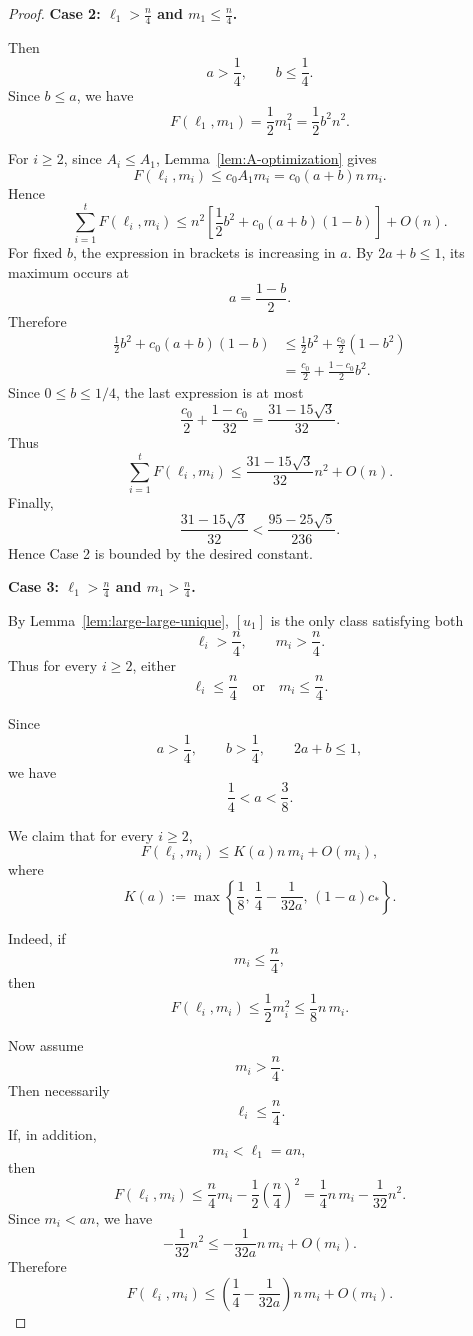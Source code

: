 \documentclass[10pt,a4paper]{amsart}
\begin{document}
\begin{proof}
\medskip

\noindent
\textbf{Case 2: \(\ell_1>\frac n4\) and \(m_1\le\frac n4\).}

Then
\[
        a>\frac14,
        \qquad
        b\le\frac14.
\]
Since \(b\le a\), we have
\[
        F(\ell_1,m_1)=\frac12m_1^2=\frac12b^2n^2.
\]

For \(i\ge2\), since \(A_i\le A_1\), Lemma~\ref{lem:A-optimization} gives
\[
        F(\ell_i,m_i)\le c_0A_1m_i
        =
        c_0(a+b)n\,m_i.
\]
Hence
\[
        \sum_{i=1}^tF(\ell_i,m_i)
        \le
        n^2\left[
        \frac12b^2+c_0(a+b)(1-b)
        \right]+O(n).
\]
For fixed \(b\), the expression in brackets is increasing in \(a\). By
\(2a+b\le1\), its maximum occurs at
\[
        a=\frac{1-b}{2}.
\]
Therefore
\[
\begin{aligned}
        \frac12b^2+c_0(a+b)(1-b)
        &\le
        \frac12b^2+\frac{c_0}{2}(1-b^2)\\
        &=
        \frac{c_0}{2}+\frac{1-c_0}{2}b^2.
\end{aligned}
\]
Since \(0\le b\le1/4\), the last expression is at most
\[
        \frac{c_0}{2}+\frac{1-c_0}{32}
        =
        \frac{31-15\sqrt3}{32}.
\]
Thus
\[
        \sum_{i=1}^tF(\ell_i,m_i)
        \le
        \frac{31-15\sqrt3}{32}n^2+O(n).
\]
Finally,
\[
        \frac{31-15\sqrt3}{32}
        <
        \frac{95-25\sqrt5}{236}.
\]
Hence Case 2 is bounded by the desired constant.

\medskip

\noindent
\textbf{Case 3: \(\ell_1>\frac n4\) and \(m_1>\frac n4\).}

By Lemma~\ref{lem:large-large-unique}, \([u_1]\) is the only class satisfying
both
\[
        \ell_i>\frac n4,
        \qquad
        m_i>\frac n4.
\]
Thus for every \(i\ge2\), either
\[
        \ell_i\le\frac n4
        \quad\text{or}\quad
        m_i\le\frac n4.
\]

Since
\[
        a>\frac14,
        \qquad
        b>\frac14,
        \qquad
        2a+b\le1,
\]
we have
\[
        \frac14<a<\frac38.
\]

We claim that for every \(i\ge2\),
\[
        F(\ell_i,m_i)\le K(a)n\,m_i+O(m_i),
\]
where
\[
K(a):=
\max\left\{
        \frac18,\,
        \frac14-\frac{1}{32a},\,
        (1-a)c_*
\right\}.
\]

Indeed, if
\[
        m_i\le\frac n4,
\]
then
\[
        F(\ell_i,m_i)\le \frac12m_i^2\le \frac18n\,m_i.
\]

Now assume
\[
        m_i>\frac n4.
\]
Then necessarily
\[
        \ell_i\le\frac n4.
\]
If, in addition,
\[
        m_i<\ell_1=an,
\]
then
\[
        F(\ell_i,m_i)
        \le
        \frac n4m_i-\frac12\left(\frac n4\right)^2
        =
        \frac14n\,m_i-\frac1{32}n^2.
\]
Since \(m_i<an\), we have
\[
        -\frac1{32}n^2
        \le
        -\frac{1}{32a}n\,m_i+O(m_i).
\]
Therefore
\[
        F(\ell_i,m_i)
        \le
        \left(\frac14-\frac{1}{32a}\right)n\,m_i+O(m_i).
\]


\end{proof}
\end{document}
